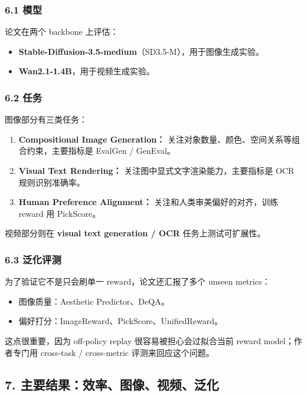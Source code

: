 \subsubsection{6.1 模型}

论文在两个 backbone 上评估：

\begin{itemize}[leftmargin=1.5em]
  \item \textbf{Stable-Diffusion-3.5-medium}（SD3.5-M），用于图像生成实验。
  \item \textbf{Wan2.1-1.4B}，用于视频生成实验。
\end{itemize}

\subsubsection{6.2 任务}

图像部分有三类任务：

\begin{enumerate}[leftmargin=1.5em]
  \item \textbf{Compositional Image Generation：} 关注对象数量、颜色、空间关系等组合约束，主要指标是 EvalGen / GenEval。
  \item \textbf{Visual Text Rendering：} 关注图中显式文字渲染能力，主要指标是 OCR 规则识别准确率。
  \item \textbf{Human Preference Alignment：} 关注和人类审美偏好的对齐，训练 reward 用 PickScore。
\end{enumerate}

视频部分则在 \textbf{visual text generation / OCR} 任务上测试可扩展性。

\subsubsection{6.3 泛化评测}

为了验证它不是只会刷单一 reward，论文还汇报了多个 unseen metrics：

\begin{itemize}[leftmargin=1.5em]
  \item 图像质量：Aesthetic Predictor、DeQA。
  \item 偏好打分：ImageReward、PickScore、UnifiedReward。
\end{itemize}

这点很重要，因为 off-policy replay 很容易被担心会过拟合当前 reward model；作者专门用 cross-task / cross-metric 评测来回应这个问题。

\subsection{7. 主要结果：效率、图像、视频、泛化}

